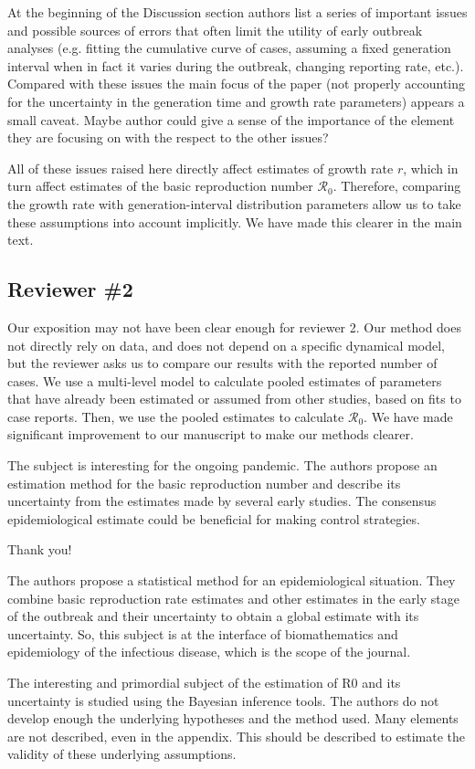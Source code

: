 \documentclass[12pt]{article}
\newcommand{\Ro}{\ensuremath{{\mathcal R}_{0}}\xspace}
\newcommand{\rev}{\subsection*}
\newcommand{\revtext}{\textsf}
\begin{document}
\revtext{
At the beginning of the Discussion section authors list a series of important issues and possible sources of errors that often limit the utility of early outbreak analyses (e.g. fitting the cumulative curve of cases, assuming a fixed generation interval when in fact it varies during the outbreak, changing reporting rate, etc.). Compared with these issues the main focus of the paper (not properly accounting for the uncertainty in the generation time and growth rate parameters) appears a small caveat. Maybe author could give a sense of the importance of the element they are focusing on with the respect to the other issues?}

All of these issues raised here directly affect estimates of growth rate $r$, which in turn affect estimates of the basic reproduction number \Ro.
Therefore, comparing the growth rate with generation-interval distribution parameters allow us to take these assumptions into account implicitly. We have made this clearer in the main text.

\rev{Reviewer \#2}

Our exposition may not have been clear enough for reviewer 2.
Our method does not directly rely on data, and does not depend on a specific dynamical model, but the reviewer asks us to compare our results with the reported number of cases.
We use a multi-level model to calculate pooled estimates of parameters that have already been estimated or assumed from other studies, based on fits to case reports.
Then, we use the pooled estimates to calculate $\mathcal R_0$.
We have made significant improvement to our manuscript to make our methods clearer.

\revtext{The subject is interesting for the ongoing pandemic. The authors propose an estimation method
for the basic reproduction number and describe its uncertainty from the estimates made by
several early studies. The consensus epidemiological estimate could be beneficial for making
control strategies.}

Thank you!

\revtext{The authors propose a statistical method for an epidemiological situation. They combine basic
reproduction rate estimates and other estimates in the early stage of the outbreak and their
uncertainty to obtain a global estimate with its uncertainty. So, this subject is at the interface of
biomathematics and epidemiology of the infectious disease, which is the scope of the journal.}

\revtext{The interesting and primordial subject of the estimation of R0 and its uncertainty is studied using
the Bayesian inference tools. The authors do not develop enough the underlying hypotheses
and the method used. Many elements are not described, even in the appendix. This should be
described to estimate the validity of these underlying assumptions.}
\end{document}

